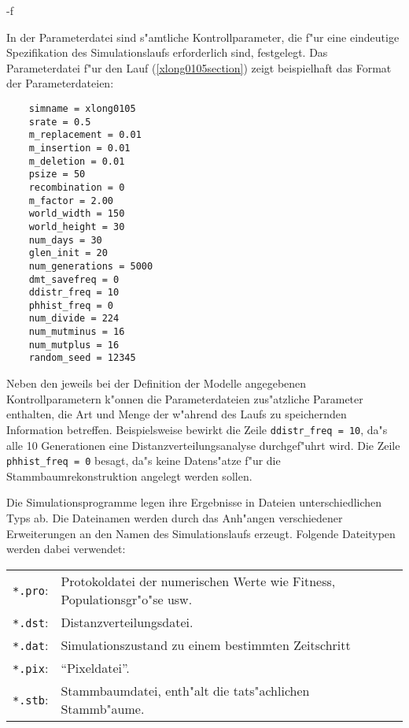 \begin{appendix}
\begin{verbatimcmd}
 -f 
\end{verbatimcmd}

In der Parameterdatei sind s"amtliche Kontrollparameter, die f"ur eine eindeutige Spezifikation
des Simulationslaufs erforderlich sind, festgelegt. Das Parameterdatei f"ur den Lauf 
(\ref{xlong0105section}) zeigt beispielhaft das Format der Parameterdateien:

\begin{verbatim}
    simname = xlong0105
    srate = 0.5
    m_replacement = 0.01
    m_insertion = 0.01
    m_deletion = 0.01
    psize = 50
    recombination = 0
    m_factor = 2.00
    world_width = 150
    world_height = 30
    num_days = 30
    glen_init = 20
    num_generations = 5000
    dmt_savefreq = 0
    ddistr_freq = 10
    phhist_freq = 0
    num_divide = 224
    num_mutminus = 16
    num_mutplus = 16
    random_seed = 12345
\end{verbatim}

Neben den jeweils bei der Definition der Modelle angegebenen Kontrollparametern k"onnen die Parameterdateien
zus"atzliche Parameter enthalten, die Art und Menge der w"ahrend des Laufs zu speichernden Information betreffen.
Beispielsweise bewirkt die Zeile \verb|ddistr_freq = 10|, da"s alle 10 Generationen eine Distanzverteilungsanalyse
durchgef"uhrt wird. Die Zeile \verb|phhist_freq = 0| besagt, da"s keine Datens"atze f"ur die Stammbaumrekonstruktion
angelegt werden sollen.

Die Simulationsprogramme legen ihre Ergebnisse in Dateien unterschiedlichen Typs ab. Die Dateinamen
werden durch das Anh"angen verschiedener Erweiterungen an den Namen des Simulationslaufs erzeugt.
Folgende Dateitypen werden dabei verwendet:

\medskip
\begin{tabular}{ll}
\verb|*.pro|: & Protokoldatei der numerischen Werte wie Fitness, Populationsgr"o"se usw. \\
\verb|*.dst|: & Distanzverteilungsdatei. \\
\verb|*.dat|: & Simulationszustand zu einem bestimmten Zeitschritt \\
\verb|*.pix|: & "`Pixeldatei"'. \\
\verb|*.stb|: & Stammbaumdatei, enth"alt die tats"achlichen Stammb"aume. \\
\end{tabular}
\medskip


\end{appendix}
